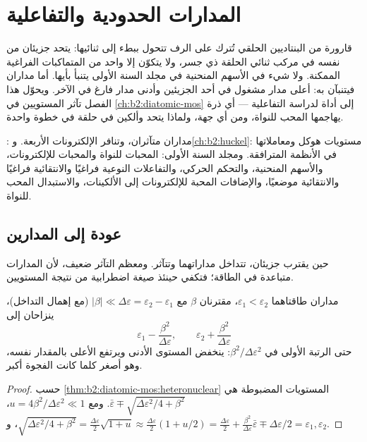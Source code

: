 \chapter{المدارات الحدودية والتفاعلية}\label{ch:b2:frontier-orbitals}

قارورة من البنتاديين الحلقي تُترك على الرف تتحول ببطء إلى ثنائيها:
يتحد جزيئان من  نفسه في مركب ثنائي الحلقة ذي جسر، 
ولا يتكوّن إلا واحد من المتماكبات الفراغية الممكنة. ولا شيء في الأسهم المنحنية في
مجلد السنة الأولى يتنبأ بأيها. أما مداران فيتنبآن به: أعلى مدار مشغول
في أحد الجزيئين وأدنى مدار فارغ في الآخر. ويحوّل هذا
الفصل تآثر المستويين في \cref{ch:b2:diatomic-mos} إلى
أداة لدراسة التفاعلية --- أي ذرة يهاجمها المحب للنواة، ومن أي جهة، 
ولماذا يتحد  وألكين في حلقة في خطوة واحدة.

\begin{recall}
: مداران متآثران، وتنافر الإلكترونات الأربعة.
و\cref{ch:b2:huckel}: مستويات هوكل ومعاملاتها في الأنظمة المترافقة.
ومجلد السنة الأولى: المحبات للنواة والمحبات للإلكترونات، والأسهم المنحنية، والتحكم
الحركي، والتفاعلات النوعية فراغيًا والانتقائية فراغيًا والانتقائية موضعيًا،
والإضافات المحبة للإلكترونات إلى الألكينات، والاستبدال المحب للنواة.
\end{recall}

\section{عودة إلى المدارين}

حين يقترب جزيئان، تتداخل مداراتهما وتتآثر. ومعظم
التآثر ضعيف، لأن المدارات متباعدة في الطاقة؛ فتكفي حينئذ صيغة اضطرابية من
نتيجة المستويين.

\begin{theorem}\label{thm:b2:frontier-orbitals:perturbation}
مداران طاقتاهما $\varepsilon_1 < \varepsilon_2$، مقترنان 
$\beta$ مع $|\beta| \ll \Delta\varepsilon = \varepsilon_2 - \varepsilon_1$ (مع إهمال التداخل)،
ينزاحان إلى
\[
  \varepsilon_1 - \frac{\beta^2}{\Delta\varepsilon}, \qquad \varepsilon_2 + \frac{\beta^2}{\Delta\varepsilon}
\]
حتى الرتبة الأولى في $\beta^2/\Delta\varepsilon^2$: ينخفض المستوى الأدنى ويرتفع الأعلى بالمقدار
نفسه، وهو أصغر كلما كانت الفجوة أكبر.
\end{theorem}

\begin{proof}
حسب \cref{thm:b2:diatomic-mos:heteronuclear} المستويات المضبوطة هي $\bar\varepsilon \mp
\sqrt{\Delta\varepsilon^2/4 + \beta^2}$. ومع $u = 4\beta^2/\Delta\varepsilon^2 \ll 1$، $\sqrt{\Delta\varepsilon^2/4
+ \beta^2} = \frac{\Delta\varepsilon}{2}\sqrt{1 + u} \approx \frac{\Delta\varepsilon}{2}(1 + u/2) =
\frac{\Delta\varepsilon}{2} + \frac{\beta^2}{\Delta\varepsilon}$، و$\bar\varepsilon \mp \Delta\varepsilon/2 = \varepsilon_1,
\varepsilon_2$.
\end{proof}

